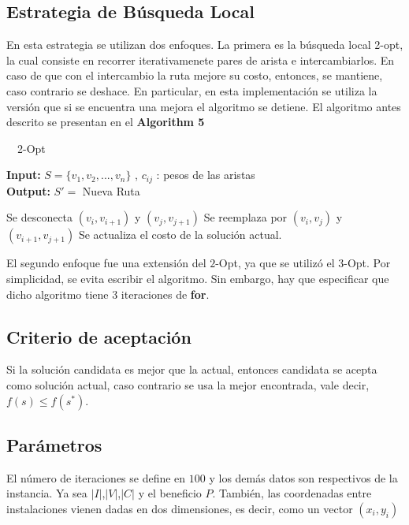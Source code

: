 \documentclass[11pt]{article}
\begin{document}
\subsection{Estrategia de Búsqueda Local}
En esta estrategia se utilizan dos enfoques. La primera es la búsqueda local 2-opt, la cual consiste
en recorrer iterativamenete pares de arista e intercambiarlos. En caso de que con el intercambio la ruta
mejore su costo, entonces, se mantiene, caso contrario se deshace. En particular, en esta implementación
se utiliza la versión que si se encuentra una mejora el algoritmo se detiene. El algoritmo antes descrito se
presentan en el  \textbf{Algorithm 5}
\begin{algorithm}[H]
    \caption{\ \ 2-Opt}
    \label{2-opt}
    \hspace*{} \textbf{Input:} $S=\{v_1,v_2,...,v_n\}$ , $c_{ij}$ : pesos de las aristas \\
    \hspace*{} \textbf{Output:} $S'=$ Nueva Ruta 
    \begin{algorithmic}[1]
             \Then
                \State Se desconecta $(v_i,v_{i+1})$ y $(v_j,v_{j+1})$
                \State Se reemplaza por $(v_i,v_j)$ y $(v_{i+1},v_{j+1})$
                \State Se actualiza el costo de la solución actual.
            \EndIf
        \EndFor
    \EndFor
    \end{algorithmic}
\end{algorithm}
El segundo enfoque fue una extensión del $2$-Opt, ya que se utilizó el $3$-Opt. Por simplicidad, se evita escribir el algoritmo. Sin embargo, hay que especificar que dicho algoritmo tiene 3 iteraciones de \textbf{for}.
\subsection{Criterio de aceptación}
Si la solución candidata es mejor que la actual, entonces candidata se acepta como solución actual, caso contrario se usa la mejor encontrada, vale decir, $f(s) \leq f(s^*)$.
\subsection{Parámetros}
El número de iteraciones se define en $100$ y los demás datos son respectivos de la instancia. Ya sea $|I|$,$|V|$,$|C|$ y el beneficio $P$. También, las coordenadas entre instalaciones vienen dadas en dos dimensiones, es decir, como un vector $(x_i, y_i)$ 
\end{document}
